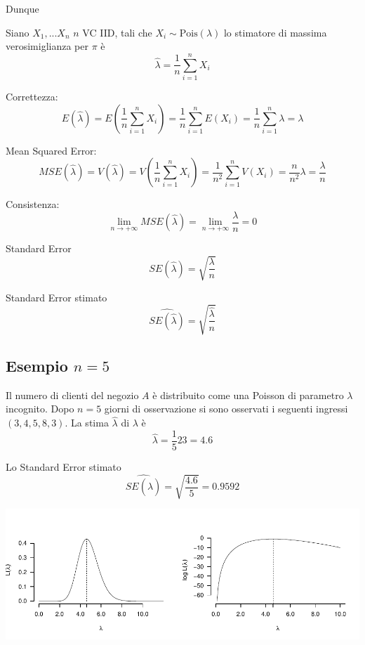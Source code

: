 \documentclass[
  11pt,
]{book}
\theoremstyle{mytheoremstyle}
\theoremstyle{mydefstyle}
\begin{document}
Dunque

\begin{info}
Siano \(X_1,...X_n\) \(n\) VC IID, tali che \(X_i\sim\text{Pois}(\lambda)\) lo stimatore
di massima verosimiglianza per \(\pi\) è
\[\hat \lambda=\frac 1n \sum_{i=1}^nX_i\]

\end{info}

\begin{info}
Correttezza:
\[
  E(\hat\lambda) =  E\left(\frac{1}n\sum_{i=1}^n X_i\right) = \frac 1 n \sum_{i=1}^n E(X_i) = \frac 1 n \sum_{i=1}^n \lambda = \lambda
\]

\end{info}

\begin{info}
Mean Squared Error:
\[
  MSE(\hat\lambda) = V(\hat\lambda)
                   = V\left(\frac 1 n \sum_{i=1}^n X_i\right)
                 = \frac 1 {n^2} \sum_{i=1}^n V(X_i)
                 = \frac n {n^2} \lambda
                 = \frac {\lambda}n
\]

\end{info}

\begin{info}
Consistenza:
\[
  \lim_{n\to+\infty} MSE(\hat\lambda) = \lim_{n\to+\infty} \frac {\lambda}n = 0
\]

\end{info}

\begin{info}
Standard Error
\[SE(\hat\lambda)=\sqrt{\frac {\lambda}n}\]

Standard Error stimato
\[\widehat{SE(\hat\lambda)}=\sqrt{\frac {\hat\lambda}n}\]

\end{info}

\subsection{\texorpdfstring{Esempio \(n=5\)}{Esempio n=5}}\label{esempio-n5}

Il numero di clienti del negozio \(A\) è distribuito come una Poisson di parametro \(\lambda\) incognito. Dopo \(n=5\) giorni di osservazione si sono osservati i seguenti ingressi \((3, 4, 5, 8, 3)\).
La stima \(\hat\lambda\) di \(\lambda\) è
\[\hat\lambda=\frac 1 523=4.6\]

Lo Standard Error stimato
\[\widehat{SE(\hat\lambda)}=\sqrt{\frac {4.6}5}=0.9592\]

\begin{center}\includegraphics{Appunti_di_Statistica_2025_files/figure-latex/12-Verosimiglianza-20-1} \end{center}
\end{document}
